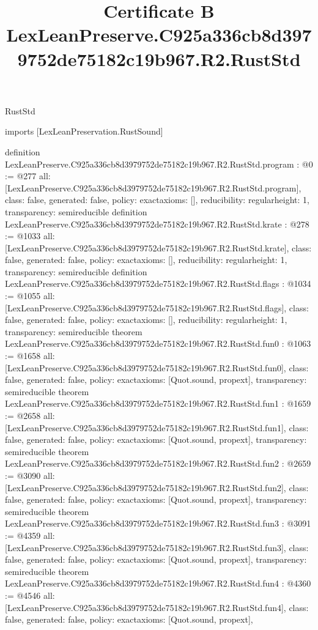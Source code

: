 \begin{lexlean}{RustStd}
\title{Certificate B LexLeanPreserve.C925a336cb8d3979752de75182c19b967.R2.RustStd}
\begin{coremodule}
imports [LexLeanPreservation.RustSound]

definition LexLeanPreserve.C925a336cb8d3979752de75182c19b967.R2.RustStd.program : @0 := @277 {
  all: [LexLeanPreserve.C925a336cb8d3979752de75182c19b967.R2.RustStd.program],
  class: false,
  generated: false,
  policy: exact{axioms: []},
  reducibility: regular{height: 1},
  transparency: semireducible
}
definition LexLeanPreserve.C925a336cb8d3979752de75182c19b967.R2.RustStd.krate : @278 := @1033 {
  all: [LexLeanPreserve.C925a336cb8d3979752de75182c19b967.R2.RustStd.krate],
  class: false,
  generated: false,
  policy: exact{axioms: []},
  reducibility: regular{height: 1},
  transparency: semireducible
}
definition LexLeanPreserve.C925a336cb8d3979752de75182c19b967.R2.RustStd.flags : @1034 := @1055 {
  all: [LexLeanPreserve.C925a336cb8d3979752de75182c19b967.R2.RustStd.flags],
  class: false,
  generated: false,
  policy: exact{axioms: []},
  reducibility: regular{height: 1},
  transparency: semireducible
}
theorem LexLeanPreserve.C925a336cb8d3979752de75182c19b967.R2.RustStd.fun0 : @1063 := @1658 {
  all: [LexLeanPreserve.C925a336cb8d3979752de75182c19b967.R2.RustStd.fun0],
  class: false,
  generated: false,
  policy: exact{axioms: [Quot.sound, propext]},
  transparency: semireducible
}
theorem LexLeanPreserve.C925a336cb8d3979752de75182c19b967.R2.RustStd.fun1 : @1659 := @2658 {
  all: [LexLeanPreserve.C925a336cb8d3979752de75182c19b967.R2.RustStd.fun1],
  class: false,
  generated: false,
  policy: exact{axioms: [Quot.sound, propext]},
  transparency: semireducible
}
theorem LexLeanPreserve.C925a336cb8d3979752de75182c19b967.R2.RustStd.fun2 : @2659 := @3090 {
  all: [LexLeanPreserve.C925a336cb8d3979752de75182c19b967.R2.RustStd.fun2],
  class: false,
  generated: false,
  policy: exact{axioms: [Quot.sound, propext]},
  transparency: semireducible
}
theorem LexLeanPreserve.C925a336cb8d3979752de75182c19b967.R2.RustStd.fun3 : @3091 := @4359 {
  all: [LexLeanPreserve.C925a336cb8d3979752de75182c19b967.R2.RustStd.fun3],
  class: false,
  generated: false,
  policy: exact{axioms: [Quot.sound, propext]},
  transparency: semireducible
}
theorem LexLeanPreserve.C925a336cb8d3979752de75182c19b967.R2.RustStd.fun4 : @4360 := @4546 {
  all: [LexLeanPreserve.C925a336cb8d3979752de75182c19b967.R2.RustStd.fun4],
  class: false,
  generated: false,
  policy: exact{axioms: [Quot.sound, propext]},
}
\end{coremodule}
\end{lexlean}
